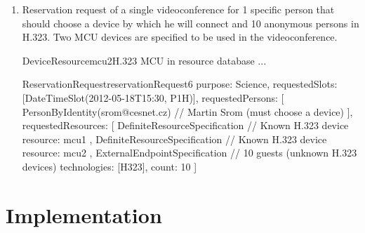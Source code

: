 \begin{enumerate}
\begin{EntityExample}{ReservationRequest}{reservationRequest5}{}
purpose: Science,
requestedSlots: [DateTimeSlot(2012-05-18T15:30, P1H)],
requestedResources: [
  VirtualRoomSpecification {
    device: mcu1,
    size: 4
  },
  DefiniteResourceSpecification { // Known H.323 device
    resource: terminal2
  },
  DefiniteResourceSpecification { // Known H.323 device
    resource: terminal3
  }
]
\end{EntityExample}

\item Reservation request of a single videoconference for 1 specific person that should choose a device by which he will connect and 10 anonymous persons in H.323. Two MCU devices are specified to be used in the videoconference.


\begin{EntityExample}{DeviceResource}{mcu2}{H.323 MCU in resource database}
...
\end{EntityExample}

\begin{EntityExample}{ReservationRequest}{reservationRequest6}{}
purpose: Science,
requestedSlots: [DateTimeSlot(2012-05-18T15:30, P1H)],
requestedPersons: [
  PersonByIdentity(srom@cesnet.cz) // Martin Srom (must choose a device)
],
requestedResources: [
  DefiniteResourceSpecification { // Known H.323 device
    resource: mcu1
  },
  DefiniteResourceSpecification { // Known H.323 device
    resource: mcu2
  },
  ExternalEndpointSpecification { // 10 guests (unknown H.323 devices)
    technologies: [H323],
    count: 10
  }
]
\end{EntityExample}

\end{enumerate}


\section{Implementation}


